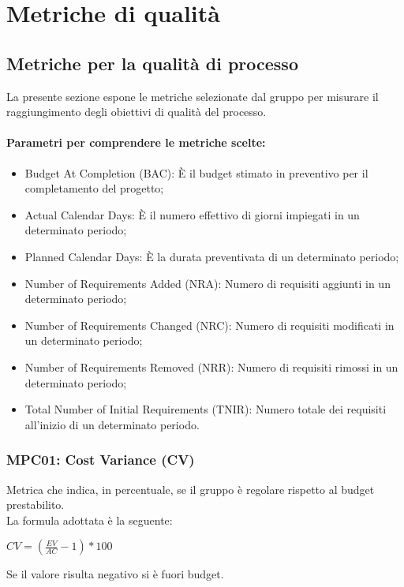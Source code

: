 \section{Metriche di qualità} \label{section:metriche_qualita}

\subsection{Metriche per la qualità di processo} \label{subsection:qualita_processo}
La presente sezione espone le metriche selezionate dal gruppo \groupName{} per misurare il raggiungimento degli obiettivi di qualità del processo.
    \paragraph*{Parametri per comprendere le metriche scelte:}
    \begin{itemize}
        \item Budget At Completion (BAC): È il budget stimato in preventivo per il completamento del progetto;
        \item Actual Calendar Days: È il numero effettivo di giorni impiegati in un determinato periodo;
        \item Planned Calendar Days: È la durata preventivata di un determinato periodo;
        \item Number of Requirements Added (NRA): Numero di requisiti aggiunti in un determinato periodo;
        \item Number of Requirements Changed (NRC): Numero di requisiti modificati in un determinato periodo;
        \item Number of Requirements Removed (NRR): Numero di requisiti rimossi in un determinato periodo;
        \item Total Number of Initial Requirements (TNIR): Numero totale dei requisiti all'inizio di un determinato periodo.
    \end{itemize}

    \subsubsection{MPC01: Cost Variance (CV)}
    Metrica che indica, in percentuale, se il gruppo è regolare rispetto al budget prestabilito.\\
    La formula adottata è la seguente:
    \begin{center}
        $CV = (\frac{EV}{AC}-1)*100$
    \end{center}
    Se il valore risulta negativo si è fuori budget.
    
